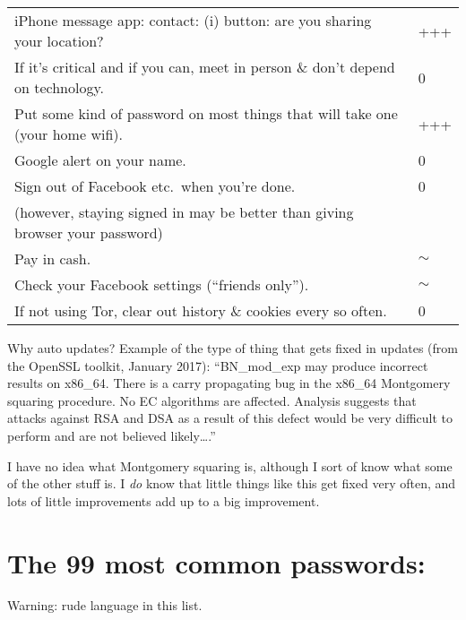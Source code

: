 \documentclass{tufte-handout}
\begin{document}
\begin{tabular}{p{5in}l}
iPhone message app: contact: (i) button: are you sharing your location? & +++ \\

If it's critical and if you can, meet in person \& don't depend on technology. & 0 \\

Put some kind of password on most things that will take one (your home wifi). & +++ \\

Google alert on your name. & 0 \\

Sign out of Facebook etc.\ when you're done. & 0 \\

\qquad \small(however, staying signed in may be better than giving browser your password) \\

Pay in cash. & $\sim$ \\

Check your Facebook settings (``friends only''). & $\sim$ \\

If not using Tor, clear out history \& cookies every so often. & 0 \\
\hline
\end{tabular}

\vspace{4ex}

Why auto updates? Example of the type of thing that gets fixed in
updates (from the OpenSSL toolkit, January 2017): ``BN\_mod\_exp may
produce incorrect results on x86\_64. There is a carry propagating bug
in the x86\_64 Montgomery squaring procedure. No EC algorithms are
affected. Analysis suggests that attacks against RSA and DSA as a
result of this defect would be very difficult to perform and are not
believed likely\ldots{}.''

I have no idea what Montgomery squaring is, although I sort of know
what some of the other stuff is. I \emph{do} know that little things
like this get fixed very often, and lots of little improvements add up
to a big improvement.

\section{The 99 most common passwords:}

Warning: rude language in this list.
\end{document}
